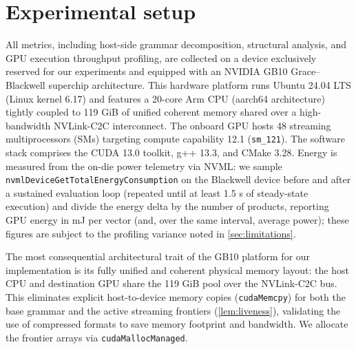 \documentclass[twoside,leqno,twocolumn]{article}
\begin{document}
\begin{table}[t]
\caption{Graph right product under Boolean and Tropical semirings across five Wikidata relations on the GB10 node (single-vector time, slash-separated per method: Boolean CSR/eng/GB, Tropical eng/GB; batched engine-only at $B{=}16$; footprint columns analytic CSR/eng). CSR: uncompressed cuSPARSE (Tropical: no vendor kernel, N/A). GB: SuiteSparse:GraphBLAS, 20 threads (\texttt{lor\_land}/\texttt{min\_plus} \texttt{mxv}, uncompressed). Dimensions in \cref{sec:semiring}; structure in \cref{tab:graph_struct}.}
\label{tab:graph}
\centering\footnotesize

\end{table}

\section{Experimental setup}
\label{sec:setup}

All metrics, including host-side grammar decomposition, structural analysis, and GPU execution throughput profiling, are collected on a device exclusively reserved for our experiments and equipped with an NVIDIA GB10 Grace–Blackwell superchip architecture. This hardware platform runs Ubuntu 24.04 LTS (Linux kernel 6.17) and features a 20-core Arm CPU (aarch64 architecture) tightly coupled to 119 GiB of unified coherent memory shared over a high-bandwidth NVLink-C2C interconnect. The onboard GPU hosts 48 streaming multiprocessors (SMs) targeting compute capability 12.1 ({\tt sm\_121}). The software stack comprises the CUDA 13.0 toolkit, g++ 13.3, and CMake 3.28. Energy is measured from the on-die power telemetry via NVML: we sample {\tt nvmlDeviceGetTotalEnergyConsumption} on the Blackwell device before and after a sustained evaluation loop (repeated until at least 1.5 s of steady-state execution) and divide the energy delta by the number of products, reporting GPU energy in mJ per vector (and, over the same interval, average power); these figures are subject to the profiling variance noted in \cref{sec:limitations}.

The most consequential architectural trait of the GB10 platform for our implementation is its fully unified and coherent physical memory layout: the host CPU and destination GPU share the 119 GiB pool over the NVLink-C2C bus. This eliminates explicit host-to-device memory copies ({\tt cudaMemcpy}) for both the base grammar and the active streaming frontiers (\cref{lem:liveness}), validating the use of compressed formats to save memory footprint and bandwidth. We allocate the frontier arrays via {\tt cudaMallocManaged}.
\end{document}
